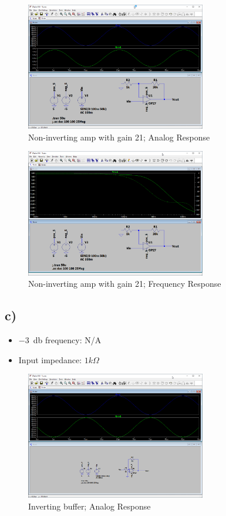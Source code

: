 \documentclass{article}
\begin{document}
	\begin{figure}[H]
	    \centering
	    \includegraphics[width=0.7\textwidth]{1b-1}
	    \caption{Non-inverting amp with gain 21; Analog Response}
	\end{figure}

	\begin{figure}[H]
	    \centering
	    \includegraphics[width=0.7\textwidth]{1b-2}
	    \caption{Non-inverting amp with gain 21; Frequency Response}
	\end{figure}
		
	\subsection*{c)}
	
	\begin{itemize}
		\item \SI{-3}{\decibel} frequency: N/A
		\item Input impedance: $1k \Omega$
	\end{itemize}
	
	\begin{figure}[H]
	    \centering
	    \includegraphics[width=0.7\textwidth]{1c-1}
	    \caption{Inverting buffer; Analog Response}
	\end{figure}
\end{document}
